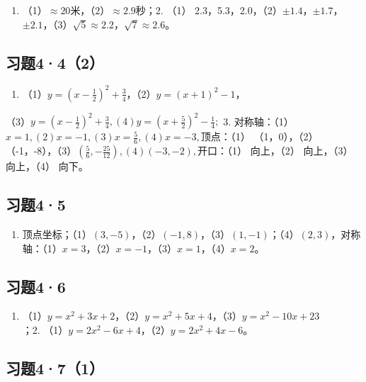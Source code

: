 \begin{enumerate}
\item
  （1）\(\approx 20\)米，（2）\(\approx 2.9\)秒；2. （1）
  2.3，5.3，2.0，（2）\(\pm 1.4\)，\(\pm 1.7\)，\(\pm 2.1\)，（3）\(\sqrt{5} \approx 2.2\)，\(\sqrt{7} \approx 2.6\)。
\end{enumerate}

\subsection{习题4·4（2）}

\begin{enumerate}[start=2]
\item
  （1）\(y = \left(x - \frac{1}{2}\right)^2 + \frac{3}{4}\)，（2）\(y = (x + 1)^2 - 1\)，
\end{enumerate}

（3）\(y = \left(x - \frac{1}{2}\right)^2 + \frac{3}{4}, (4) y = \left(x + \frac{5}{2}\right)^2 - \frac{1}{4};\)
3.
对称轴：（1）\(x = 1, (2) x = -1, (3) x = \frac{5}{6}, (4) x = -3,\)顶点：（1）
（1，0），（2）
（-1，-8），（3）\(\left(\frac{5}{6}, -\frac{25}{12}\right), (4) (-3, -2),\)开口：（1）
向上，（2） 向上，（3） 向上，（4） 向下。

\subsection{习题4·5}

\begin{enumerate}
\item
  顶点坐标；（1）\((3, -5)\)，（2）\((-1, 8)\)，（3）\((1, -1)\)；（4）\((2, 3)\)，对称轴：（1）\(x = 3\)，（2）\(x = -1\)，（3）\(x = 1\)，（4）\(x = 2\)。
\end{enumerate}

\subsection{习题4·6}

\begin{enumerate}
\item
  （1）\(y = x^2 + 3x + 2\)，（2）\(y = x^2 + 5x + 4\)，（3）\(y = x^2 - 10x + 23\)；2.
  （1）\(y = 2x^2 - 6x + 4\)，（2）\(y = 2x^2 + 4x - 6\)。
\end{enumerate}

\subsection{习题4·7（1）}

